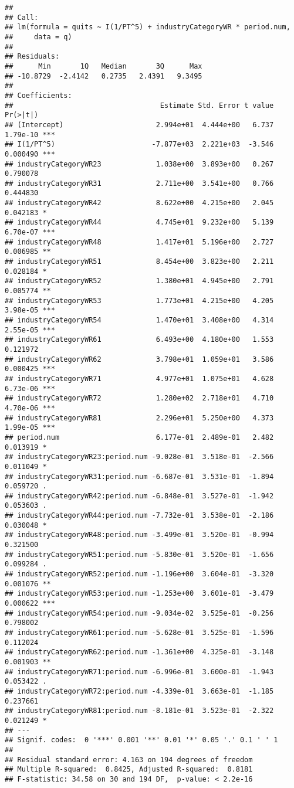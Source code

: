 \documentclass[
]{article}
\begin{document}
\begin{verbatim}
## 
## Call:
## lm(formula = quits ~ I(1/PT^5) + industryCategoryWR * period.num, 
##     data = q)
## 
## Residuals:
##      Min       1Q   Median       3Q      Max 
## -10.8729  -2.4142   0.2735   2.4391   9.3495 
## 
## Coefficients:
##                                   Estimate Std. Error t value Pr(>|t|)    
## (Intercept)                      2.994e+01  4.444e+00   6.737 1.79e-10 ***
## I(1/PT^5)                       -7.877e+03  2.221e+03  -3.546 0.000490 ***
## industryCategoryWR23             1.038e+00  3.893e+00   0.267 0.790078    
## industryCategoryWR31             2.711e+00  3.541e+00   0.766 0.444830    
## industryCategoryWR42             8.622e+00  4.215e+00   2.045 0.042183 *  
## industryCategoryWR44             4.745e+01  9.232e+00   5.139 6.70e-07 ***
## industryCategoryWR48             1.417e+01  5.196e+00   2.727 0.006985 ** 
## industryCategoryWR51             8.454e+00  3.823e+00   2.211 0.028184 *  
## industryCategoryWR52             1.380e+01  4.945e+00   2.791 0.005774 ** 
## industryCategoryWR53             1.773e+01  4.215e+00   4.205 3.98e-05 ***
## industryCategoryWR54             1.470e+01  3.408e+00   4.314 2.55e-05 ***
## industryCategoryWR61             6.493e+00  4.180e+00   1.553 0.121972    
## industryCategoryWR62             3.798e+01  1.059e+01   3.586 0.000425 ***
## industryCategoryWR71             4.977e+01  1.075e+01   4.628 6.73e-06 ***
## industryCategoryWR72             1.280e+02  2.718e+01   4.710 4.70e-06 ***
## industryCategoryWR81             2.296e+01  5.250e+00   4.373 1.99e-05 ***
## period.num                       6.177e-01  2.489e-01   2.482 0.013919 *  
## industryCategoryWR23:period.num -9.028e-01  3.518e-01  -2.566 0.011049 *  
## industryCategoryWR31:period.num -6.687e-01  3.531e-01  -1.894 0.059720 .  
## industryCategoryWR42:period.num -6.848e-01  3.527e-01  -1.942 0.053603 .  
## industryCategoryWR44:period.num -7.732e-01  3.538e-01  -2.186 0.030048 *  
## industryCategoryWR48:period.num -3.499e-01  3.520e-01  -0.994 0.321500    
## industryCategoryWR51:period.num -5.830e-01  3.520e-01  -1.656 0.099284 .  
## industryCategoryWR52:period.num -1.196e+00  3.604e-01  -3.320 0.001076 ** 
## industryCategoryWR53:period.num -1.253e+00  3.601e-01  -3.479 0.000622 ***
## industryCategoryWR54:period.num -9.034e-02  3.525e-01  -0.256 0.798002    
## industryCategoryWR61:period.num -5.628e-01  3.525e-01  -1.596 0.112024    
## industryCategoryWR62:period.num -1.361e+00  4.325e-01  -3.148 0.001903 ** 
## industryCategoryWR71:period.num -6.996e-01  3.600e-01  -1.943 0.053422 .  
## industryCategoryWR72:period.num -4.339e-01  3.663e-01  -1.185 0.237661    
## industryCategoryWR81:period.num -8.181e-01  3.523e-01  -2.322 0.021249 *  
## ---
## Signif. codes:  0 '***' 0.001 '**' 0.01 '*' 0.05 '.' 0.1 ' ' 1
## 
## Residual standard error: 4.163 on 194 degrees of freedom
## Multiple R-squared:  0.8425, Adjusted R-squared:  0.8181 
## F-statistic: 34.58 on 30 and 194 DF,  p-value: < 2.2e-16
\end{verbatim}
\end{document}
